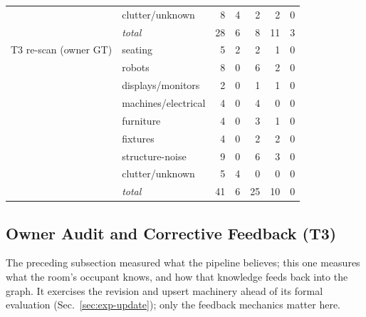 \begin{table}[t]
\begin{tabular}{@{}llrrrrr@{}}
 & clutter/unknown & 8 & 4 & 2 & 2 & 0 \\
 & \emph{total} & 28 & 6 & 8 & 11 & 3 \\
\midrule
T3 re-scan (owner GT) & seating & 5 & 2 & 2 & 1 & 0 \\
 & robots & 8 & 0 & 6 & 2 & 0 \\
 & displays/monitors & 2 & 0 & 1 & 1 & 0 \\
 & machines/electrical & 4 & 0 & 4 & 0 & 0 \\
 & furniture & 4 & 0 & 3 & 1 & 0 \\
 & fixtures & 4 & 0 & 2 & 2 & 0 \\
 & structure-noise & 9 & 0 & 6 & 3 & 0 \\
 & clutter/unknown & 5 & 4 & 0 & 0 & 0 \\
 & \emph{total} & 41 & 6 & 25 & 10 & 0 \\
\bottomrule
\end{tabular}
\end{table}

\subsection{Owner Audit and Corrective Feedback (T3)}
\label{sec:exp-owner}

The preceding subsection measured what the pipeline believes; this one
measures what the room's occupant knows, and how that knowledge feeds
back into the graph. It exercises the revision and upsert machinery ahead
of its formal evaluation (Sec.~\ref{sec:exp-update}); only the feedback
mechanics matter here.

